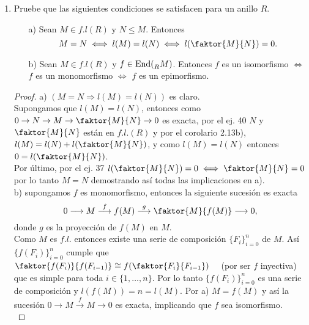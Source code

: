 \documentclass{article}
\begin{document}
\begin{enumerate}[label=\textbf{Ej \arabic*.}]
\begin{proof}
	Ahora, dado que $f$ es un monomorfismo, se tiene que $B_{t} \cong A_{t}$, para $t \leq n$. Y por otro lado, el teorema de la correspondencia y el tercer teorema de isomorfismo garantizan que $\displaystyle\frac{B_{t+1}}{B_{t}} = \displaystyle\frac{g^{-1}(C_{t+1})}{g^{-1}(C_{t})} \cong \displaystyle\frac{C_{t-n+1}}{C_{t-n}}$ para cada $n+1 \leq t \leq n+m$. Más aún, tenemos que los cocientes $\displaystyle\frac{B_{t+1}}{B_{t}}$ son simples, toda vez que los cocientes $\displaystyle\frac{A_{i+1}}{A_{i}}$ y $\displaystyle\frac{C_{j+1}}{C_{j}}$ lo son. De esta forma $\mathfrak{B}$ es una serie de composición para $B$. $\therefore B \in f.l.\lrprth{R}$
\end{proof}


\item Pruebe que las siguientes condiciones se satisfacen para un anillo $R$.\\
\begin{itemize}
\item[a)] Sean $M\in f.l(R)$ y $N\leq M$. Entonces 
\[M=N\iff l(M)=l(N)\iff l(\faktor{M}{N})=0.\]
\item[b)] Sean $M\in f.l(R)$ y $f\in \operatorname{End}(\prescript{}{R}{M})$. Entonces $f$ es un isomorfismo $\iff$ $f$ es un 
monomorfismo $\iff$ $f$ es un epimorfismo.
\end{itemize}
\begin{proof}
a) $\left(M=N\Rightarrow l(M)=l(N)\right)$ es claro.\\
Supongamos que $l(M)=l(N)$, entonces como $0\to N\to M\to \faktor{M}{N}\to 0$ es exacta, por el ej. 40 $N$ y $\faktor{M}{N}$ están en $f.l.(R)$
y por el corolario 2.13b), $l(M)=l(N)+l(\faktor{M}{N})$, y como $l(M)=l(N)$ entonces $0=l(\faktor{M}{N})$.\\
Por último, por el ej. 37      $l(\faktor{M}{N})=0\iff \faktor{M}{N}=0$ por lo tanto $M=N$ demostrando así  todas las implicaciones en a).\\

b) supongamos $f$ es monomorfismo, entonces la siguiente sucesión es exacta 
\[0\longrightarrow M \stackrel{f}{\longrightarrow} f(M) \stackrel{g}{\longrightarrow} \faktor{M}{f(M)}\longrightarrow 0,\]
donde $g$ es la proyección de $f(M)$ en $M$.\\

Como $M$ es $f.l.$ entonces existe una serie de composición $\{F_i\}_{i=0}^n$ de $M$. Así $\{f(F_i)\}_{i=0}^n$ cumple que \quad
$\faktor{f(F_i)}{f(F_{i-1})}\cong f(\faktor{F_i}{F_{i-1}})\quad$ (por ser $f$ inyectiva) que es simple para toda $i\in \{1,\ldots, n\}$.
Por lo tanto $\{f(F_i)\}_{i=0}^n$ es una serie de composición y $l(f(M))=n=l(M)$. Por a) $M=f(M)$ y así la sucesión 
$0\longrightarrow M \stackrel{f}{\longrightarrow} M\longrightarrow 0 $ es exacta, implicando que $f$ sea isomorfismo.\\


\end{proof}
\end{enumerate}
\end{document}
